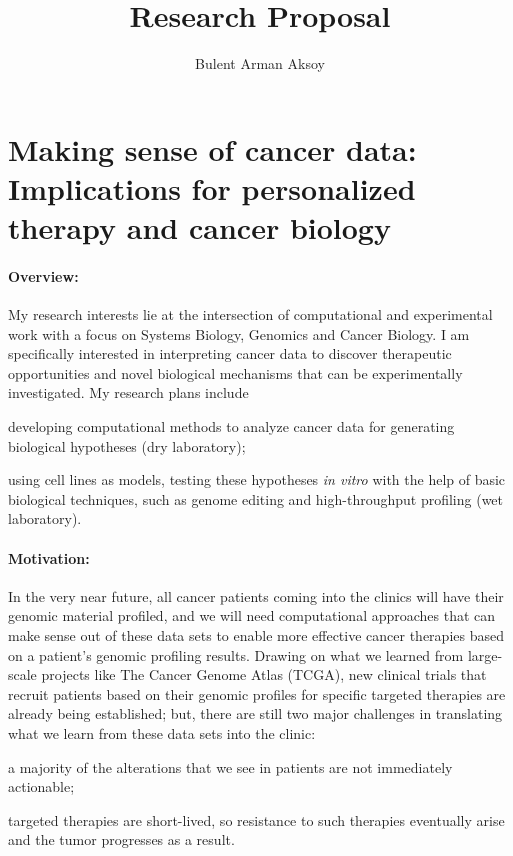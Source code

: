 \documentclass[11pt,letterpaper]{article}
\title{Research Proposal}
\author{Bulent Arman Aksoy}
\date{}
\begin{document}
\maketitle

\section*{Making sense of cancer data: Implications for personalized therapy and cancer biology}
\paragraph{Overview:}
My research interests lie at the intersection of computational and experimental work with a focus on Systems Biology, Genomics and Cancer Biology.
I am specifically interested in interpreting cancer data to discover therapeutic opportunities and novel biological mechanisms that can be experimentally investigated.
My research plans include
\begin{inparaenum}[(i)]
 \item developing computational methods to analyze cancer data for generating biological hypotheses (dry laboratory);
 \item using cell lines as models, testing these hypotheses \textit{in vitro} with the help of basic biological techniques, such as genome editing and high-throughput profiling (wet laboratory).
\end{inparaenum}

\paragraph{Motivation:}
In the very near future, all cancer patients coming into the clinics will have their genomic material profiled,
and we will need computational approaches that can make sense out of these data sets to enable more effective cancer therapies based on a patient's genomic profiling results.
Drawing on what we learned from large-scale projects like The Cancer Genome Atlas (TCGA), 
new clinical trials that recruit patients based on their genomic profiles for specific targeted therapies are already being established;
but, there are still two major challenges in translating what we learn from these data sets into the clinic:
\begin{inparaenum}[(i)]
 \item a majority of the alterations that we see in patients are not immediately actionable;
 \item targeted therapies are short-lived, so resistance to such therapies eventually arise and the tumor progresses as a result.
\end{inparaenum}
\end{document}
